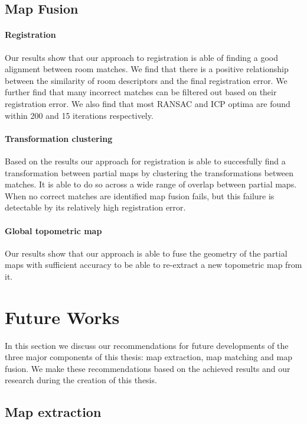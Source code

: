 \subsection{Map Fusion}

\paragraph{Registration}
Our results show that our approach to registration is able of finding a good alignment between room matches. We find that there is a positive relationship between the similarity of room descriptors and the final registration error.  We further find that many incorrect matches can be filtered out based on their registration error. We also find that most RANSAC and ICP optima are found within 200 and 15 iterations respectively.

\paragraph{Transformation clustering}
Based on the results our approach for registration is able to succesfully find a transformation between partial maps by clustering the transformations between matches. It is able to do so across a wide range of overlap between partial maps. When no correct matches are identified map fusion fails, but this failure is detectable by its relatively high registration error.

\paragraph{Global topometric map}
Our results show that our approach is able to fuse the geometry of the partial maps with sufficient accuracy to be able to re-extract a new topometric map from it. 

\pagebreak

\section{Future Works}
In this section we discuss our recommendations for future developments of the three major components of this thesis: map extraction, map matching and map fusion. We make these recommendations based on the achieved results and our research during the creation of this thesis. 

\subsection{Map extraction}

